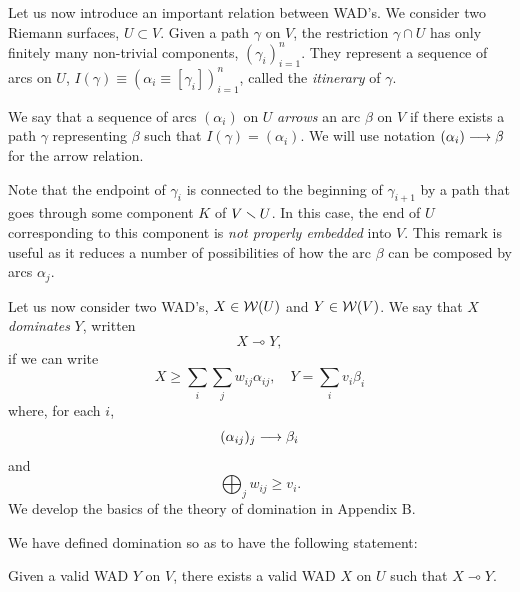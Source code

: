 Let us now introduce an important relation between WAD's.
We consider two Riemann surfaces, $U\subset V$.
Given a path $\gamma$ on $V$,
the restriction $\gamma\cap U$
has only finitely many non-trivial components,
$(\gamma_i)_{i=1}^n$.
They represent a sequence of arcs on $U$,
$I(\gamma) \equiv (\alpha_i\equiv[\gamma_i])_{i=1}^n$,
called the {\it itinerary} of $\gamma$.


We say that a sequence of arcs $(\alpha_i)$ on $U$ {\it arrows} an arc $\beta$ on $V$
if there exists a path $\gamma$ representing $\beta$ such that $I(\gamma)=(\alpha_i)$.
We will use notation $(\alpha_i) \longrightarrow \beta$ for the arrow relation.

   Note that the endpoint of $\gamma_i$ is connected to the beginning of $\gamma_{i+1}$
by a path that goes through some component $K$ of $V\smallsetminus U$. In this case,
the end of $U$ corresponding to this component is {\it not properly embedded}
into $V$. This remark is useful as it reduces a number of possibilities of
how the arc $\beta$ can be composed by arcs $\alpha_j$.
\ssk


Let us now consider two WAD's,  $X\in {\mathcal W}(U)$ and $Y\in {\mathcal W}(V)$.
We say that $X$ {\it dominates} $Y$,
written
$$X\multimap Y,$$
if we can write
$$
X\geq \sum_i \sum_j w_{ij}\alpha_{ij}, \quad Y = \sum_i v_i \beta_i
$$
where, for each $i$,
$$
(\alpha_{ij})_j \longrightarrow \beta_i
$$
and
$$
\bigoplus_j w_{ij} \ge v_i.
$$
We develop the basics of the theory of domination in Appendix B. 

We have defined domination so as to have the following statement:
\begin{lem}\label{XY}
  Given a valid WAD $Y$ on $V$, there exists a valid WAD $X$ on $U$ such that $X\multimap Y$.
\end{lem}

